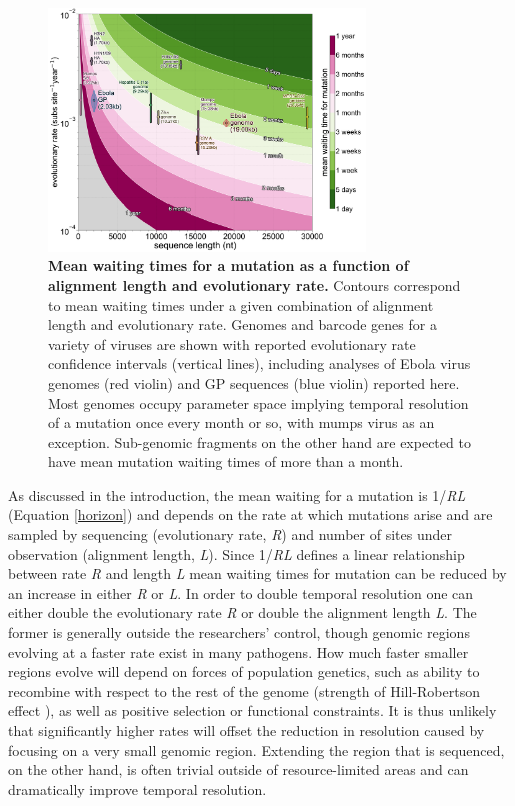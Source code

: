 \documentclass[11pt,oneside,letterpaper]{article}
\begin{document}
\begin{figure}[h]
 \centering
	\includegraphics[width=0.75\textwidth]{figures/fig5_contours.png}
	\caption{\textbf{Mean waiting times for a mutation as a function of alignment length and evolutionary rate.}
  Contours correspond to mean waiting times under a given combination of alignment length and evolutionary rate.
  Genomes and barcode genes for a variety of viruses are shown with reported evolutionary rate confidence intervals (vertical lines), including analyses of Ebola virus genomes (red violin) and GP sequences (blue violin) reported here.
  Most genomes occupy parameter space implying temporal resolution of a mutation once every month or so, with mumps virus as an exception.
  Sub-genomic fragments on the other hand are expected to have mean mutation waiting times of more than a month.
	}
	\label{contours}
\end{figure}

As discussed in the introduction, the mean waiting for a mutation is 1/\textit{RL} (Equation \ref{horizon}) and depends on the rate at which mutations arise and are sampled by sequencing (evolutionary rate, \textit{R}) and number of sites under observation (alignment length, \textit{L}).
Since 1/\textit{RL} defines a linear relationship between rate \textit{R} and length \textit{L} mean waiting times for mutation can be reduced by an increase in either \textit{R} or \textit{L}.
In order to double temporal resolution one can either double the evolutionary rate \textit{R} or double the alignment length \textit{L}.
The former is generally outside the researchers' control, though genomic regions evolving at a faster rate exist in many pathogens.
How much faster smaller regions evolve will depend on forces of population genetics, such as ability to recombine with respect to the rest of the genome (strength of Hill-Robertson effect \citep{hill_effect_1966}), as well as positive selection or functional constraints.
It is thus unlikely that significantly higher rates will offset the reduction in resolution caused by focusing on a very small genomic region.
Extending the region that is sequenced, on the other hand, is often trivial outside of resource-limited areas and can dramatically improve temporal resolution.
\end{document}
